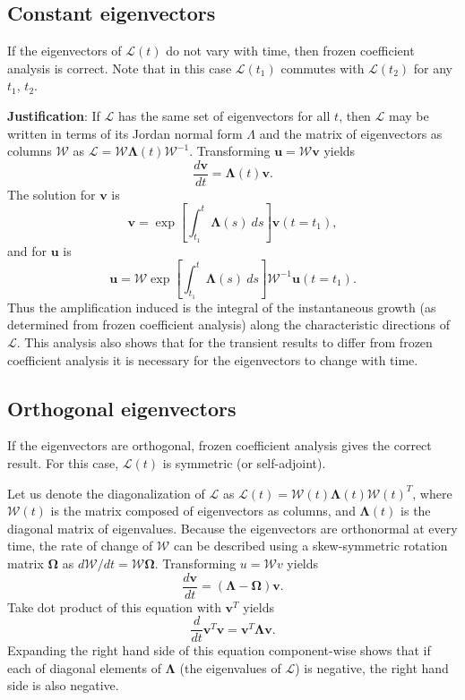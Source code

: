 \documentclass[letterpaper,10pt]{article}
\newcommand{\bu}{\boldsymbol{u}}
\newcommand{\bv}{\boldsymbol{v}}
\newcommand{\cL}{\boldsymbol{\mathcal{L}}}
\newcommand{\cW}{\boldsymbol{\mathcal{W}}}
\newcommand{\cLam}{\boldsymbol{\boldsymbol{\Lambda}}}
\newcommand{\cOmega}{\boldsymbol{\boldsymbol{\Omega}}}
\begin{document}
\subsection*{Constant eigenvectors}
If the eigenvectors of $\cL(t)$ do not vary with time, then frozen coefficient analysis is correct. Note that in this case $\cL(t_1)$ commutes with $\cL(t_2)$ for any $t_1$, $t_2$.

\textbf{Justification}: If $\cL$ has the same set of eigenvectors for all $t$, then $\cL$ may be written in terms of its Jordan normal form $\Lambda$ and the matrix of eigenvectors as columns $\cW$ as $\cL = \cW \cLam(t) \cW^{-1}$. Transforming $\bu = \cW \bv$ yields 
\begin{equation}
 \frac{d\bv}{dt} = \cLam(t) \bv.
\end{equation}
The solution for $\bv$ is 
\begin{equation}
\bv = \exp \left[ \int_{t_1}^t \cLam(s)~ds \right] \bv(t=t_1),
\end{equation}
and for $\bu$ is
\begin{equation}
\bu = \cW \exp \left[ \int_{t_1}^t \cLam(s)~ds \right] \cW^{-1} \bu(t=t_1).
\end{equation}
Thus the amplification induced is the integral of the instantaneous growth (as determined from frozen coefficient analysis) along the characteristic directions of $\cL$. This analysis also shows that for the transient results to differ from frozen coefficient analysis it is necessary for the eigenvectors to change with time.

\subsection*{Orthogonal eigenvectors}
If the eigenvectors are orthogonal, frozen coefficient analysis gives the correct result. For this case, $\cL(t)$ is symmetric (or self-adjoint).

Let us denote the diagonalization of $\cL$ as $\cL(t) = \cW(t) \cLam(t) \cW(t)^T$, where $\cW(t)$ is the matrix composed of eigenvectors as columns, and $\cLam(t)$ is the diagonal matrix of eigenvalues. Because the eigenvectors are orthonormal at every time, the rate of change of $\cW$ can be described using a skew-symmetric rotation matrix $\cOmega$ as $d \cW/dt = \cW \cOmega$. Transforming $u = \cW v$ yields
\begin{equation}
 \frac{d\bv}{dt} = (\cLam - \cOmega) \bv.
\end{equation}
Take dot product of this equation with $\bv^T$ yields
\begin{equation}
\frac{d}{dt} \bv^T \bv = \bv^T \cLam \bv. 
\end{equation}
Expanding the right hand side of this equation component-wise shows that if each of diagonal elements of $\cLam$ (the eigenvalues of $\cL$) is negative, the right hand side is also negative.
\end{document}
